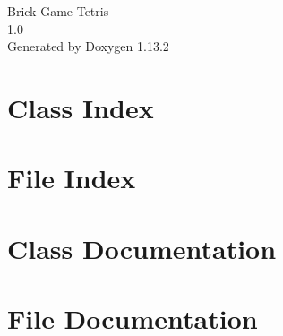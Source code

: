 \documentclass[twoside]{book}
\newcommand{\+}{\discretionary{\mbox{\scriptsize$\hookleftarrow$}}{}{}}
\newcommand{\clearemptydoublepage}{%
    \newpage{\pagestyle{empty}\cleardoublepage}%
  }
\begin{document}
  \raggedbottom
    \hypersetup{pageanchor=false,
                bookmarksnumbered=true,
                pdfencoding=unicode
               }
  \begin{titlepage}
  \vspace*{7cm}
  \begin{center}%
  {\Large Brick Game Tetris}\\
  [1ex]\large 1.\+0 \\
  \vspace*{1cm}
  {\large Generated by Doxygen 1.13.2}\\
  \end{center}
  \end{titlepage}
  \clearemptydoublepage
  \tableofcontents
  \clearemptydoublepage
  \hypersetup{pageanchor=true}
\chapter{Class Index}

\chapter{File Index}

\chapter{Class Documentation}




\chapter{File Documentation}





  \backmatter
  \newpage
  \clearemptydoublepage
  \printindex
\end{document}
